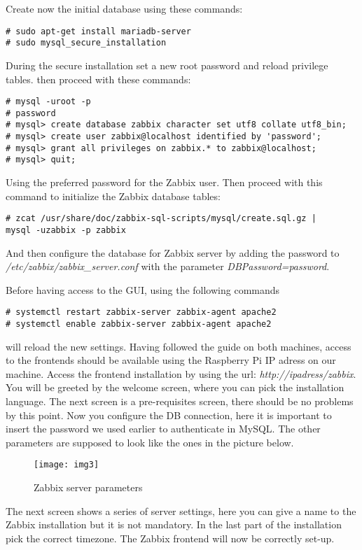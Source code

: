 \documentclass[a4paper,11pt]{scrartcl}
\begin{document}
Create now the initial database using these commands:
\begin{lstlisting}
# sudo apt-get install mariadb-server
# sudo mysql_secure_installation
\end{lstlisting}
During the secure installation set a new root password and reload privilege tables. then proceed with these commands:
\begin{lstlisting}
# mysql -uroot -p
# password
# mysql> create database zabbix character set utf8 collate utf8_bin;
# mysql> create user zabbix@localhost identified by 'password';
# mysql> grant all privileges on zabbix.* to zabbix@localhost;
# mysql> quit;
\end{lstlisting}
Using the preferred password for the Zabbix user.
Then proceed with this command to initialize the Zabbix database tables:

\begin{lstlisting}
# zcat /usr/share/doc/zabbix-sql-scripts/mysql/create.sql.gz | 
mysql -uzabbix -p zabbix
\end{lstlisting}

And then configure the database for Zabbix server by adding the password to \textit{/etc/zabbix/zabbix\_server.conf} with the parameter \textit{DBPassword=password}.

Before having access to the GUI, using the following commands
\begin{lstlisting}
# systemctl restart zabbix-server zabbix-agent apache2
# systemctl enable zabbix-server zabbix-agent apache2
\end{lstlisting}
will reload the new settings.
Having followed the guide on both machines, access to the frontends should be available using the Raspberry Pi IP adress on our machine. Access the frontend installation by using the url: \textit{http://ipadress/zabbix}. You will be greeted by the welcome screen, where you can pick the installation language. The next screen is a pre-requisites screen, there should be no problems by this point. 
Now you configure the DB connection, here it is important to insert the password we used earlier to authenticate in MySQL. The other parameters are supposed to look like the ones in the picture below.
\begin{figure}[h]
    \centering 
    \texttt{[image: img3]}
    \label{fig:figure2}
    \caption{Zabbix server parameters}
\end{figure}

The next screen shows a series of server settings, here you can give a name to the Zabbix installation but it is not mandatory. In the last part of the installation pick the correct timezone. The Zabbix frontend will now be correctly set-up.
\end{document}
